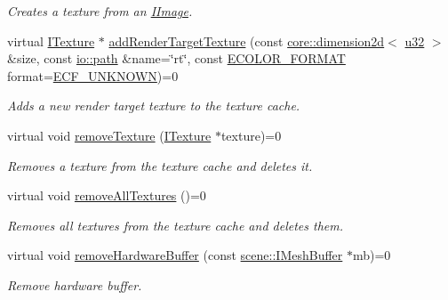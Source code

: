 \begin{DoxyCompactItemize}
\begin{DoxyCompactList}\small\item\em Creates a texture from an \hyperlink{classirr_1_1video_1_1IImage}{I\+Image}. \end{DoxyCompactList}\item 
virtual \hyperlink{classirr_1_1video_1_1ITexture}{I\+Texture} $\ast$ \hyperlink{classirr_1_1video_1_1IVideoDriver_aa704cece826ee37d02e4bb054b0b8797}{add\+Render\+Target\+Texture} (const \hyperlink{classirr_1_1core_1_1dimension2d}{core\+::dimension2d}$<$ \hyperlink{namespaceirr_a0416a53257075833e7002efd0a18e804}{u32} $>$ \&size, const \hyperlink{namespaceirr_1_1io_ab1bdc45edb3f94d8319c02bc0f840ee1}{io\+::path} \&name=\char`\"{}rt\char`\"{}, const \hyperlink{namespaceirr_1_1video_a1d5e487888c32b1674a8f75116d829ed}{E\+C\+O\+L\+O\+R\+\_\+\+F\+O\+R\+M\+AT} format=\hyperlink{namespaceirr_1_1video_a1d5e487888c32b1674a8f75116d829eda209608685f06c86c6ae489896a246e77}{E\+C\+F\+\_\+\+U\+N\+K\+N\+O\+WN})=0
\begin{DoxyCompactList}\small\item\em Adds a new render target texture to the texture cache. \end{DoxyCompactList}\item 
virtual void \hyperlink{classirr_1_1video_1_1IVideoDriver_ac88319ec41daa23fef2ae935285afcc9}{remove\+Texture} (\hyperlink{classirr_1_1video_1_1ITexture}{I\+Texture} $\ast$texture)=0
\begin{DoxyCompactList}\small\item\em Removes a texture from the texture cache and deletes it. \end{DoxyCompactList}\item 
virtual void \hyperlink{classirr_1_1video_1_1IVideoDriver_a179990e76fa91175d46c891b3508e717}{remove\+All\+Textures} ()=0
\begin{DoxyCompactList}\small\item\em Removes all textures from the texture cache and deletes them. \end{DoxyCompactList}\item 
\mbox{\label{classirr_1_1video_1_1IVideoDriver_a1454ef5ba92de420f35678e2803485f6}} 
virtual void \hyperlink{classirr_1_1video_1_1IVideoDriver_a1454ef5ba92de420f35678e2803485f6}{remove\+Hardware\+Buffer} (const \hyperlink{classirr_1_1scene_1_1IMeshBuffer}{scene\+::\+I\+Mesh\+Buffer} $\ast$mb)=0
\begin{DoxyCompactList}\small\item\em Remove hardware buffer. \end{DoxyCompactList}\item 

\end{DoxyCompactItemize}

